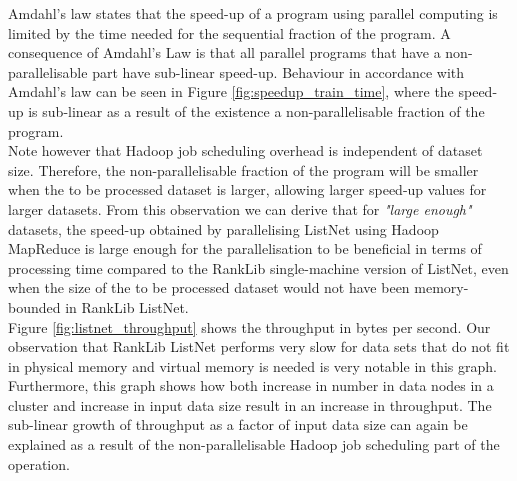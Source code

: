 Amdahl's law states that the speed-up of a program using parallel computing is limited by the time needed for the sequential fraction of the program. A consequence of Amdahl's Law is that all parallel programs that have a non-parallelisable part have sub-linear speed-up. Behaviour in accordance with Amdahl's law can be seen in Figure \ref{fig:speedup_train_time}, where the speed-up is sub-linear as a result of the existence a non-parallelisable fraction of the program.\\

Note however that Hadoop job scheduling overhead is independent of dataset size. Therefore, the non-parallelisable fraction of the program will be smaller when the to be processed dataset is larger, allowing larger speed-up values for larger datasets. From this observation we can derive that for \emph{"large enough"} datasets, the speed-up obtained by parallelising ListNet using Hadoop MapReduce is large enough for the parallelisation to be beneficial in terms of processing time compared to the RankLib single-machine version of ListNet, even when the size of the to be processed dataset would not have been memory-bounded in RankLib ListNet.\\

Figure \ref{fig:listnet_throughput} shows the throughput in bytes per second. Our observation that RankLib ListNet performs very slow for data sets that do not fit in physical memory and virtual memory is needed is very notable in this graph. Furthermore, this graph shows how both increase in number in data nodes in a cluster and increase in input data size result in an increase in throughput. The sub-linear growth of throughput as a factor of input data size can again be explained as a result of the non-parallelisable Hadoop job scheduling part of the operation.\\

